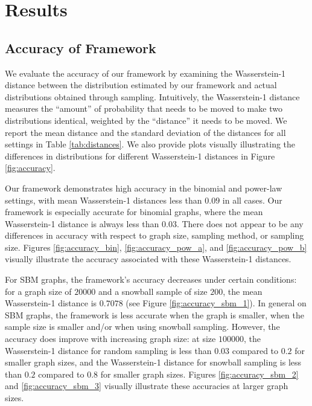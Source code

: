 \section{Results}
\label{sec:results}









\subsection{Accuracy of Framework}

We evaluate the accuracy of our framework by examining the Wasserstein-1 distance between the distribution estimated by our framework and actual distributions obtained through sampling. Intuitively, the Wasserstein-1 distance measures the ``amount'' of probability that needs to be moved to make two distributions identical, weighted by the ``distance'' it needs to be moved. We report the mean distance and the standard deviation of the distances for all settings in Table \ref{tab:distances}. We also provide plots visually illustrating the differences in distributions for different Wasserstein-1 distances in Figure \ref{fig:accuracy}.

Our framework demonstrates high accuracy in the binomial and power-law settings, with mean Wasserstein-1 distances less than $0.09$ in all cases. Our framework is especially accurate for binomial graphs, where the mean Wasserstein-1 distance is always less than $0.03$. There does not appear to be any differences in accuracy with respect to graph size, sampling method, or sampling size. Figures \ref{fig:accuracy_bin}, \ref{fig:accuracy_pow_a}, and \ref{fig:accuracy_pow_b} visually illustrate the accuracy associated with these Wasserstein-1 distances.

For SBM graphs, the framework's accuracy decreases under certain conditions: for a graph size of $20000$ and a snowball sample of size $200$, the mean Wasserstein-1 distance is $0.7078$ (see Figure \ref{fig:accuracy_sbm_1}). In general on SBM graphs, the framework is less accurate when the graph is smaller, when the sample size is smaller and/or when using snowball sampling. However, the accuracy does improve with increasing graph size: at size $100000$, the Wasserstein-1 distance for random sampling is less than $0.03$ compared to $0.2$ for smaller graph sizes, and the Wasserstein-1 distance for snowball sampling is less than $0.2$ compared to $0.8$ for smaller graph sizes. Figures \ref{fig:accuracy_sbm_2} and \ref{fig:accuracy_sbm_3} visually illustrate these accuracies at larger graph sizes.

